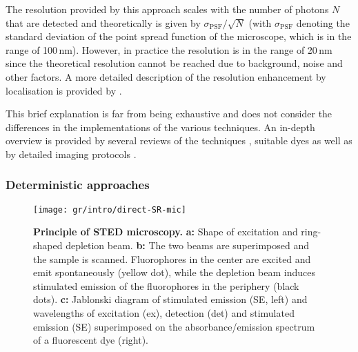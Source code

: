 The resolution provided by this approach scales with the number of photons $N$
that are detected and theoretically is given by $\sigma_\text{PSF}/\sqrt{N}$
(with $\sigma_\text{PSF}$ denoting the standard deviation of the point spread
function of the microscope, which is in the range of 100\,nm). However, in
practice the resolution is in the range of 20\,nm \cite{Betzig2006,Rust2006}
since the theoretical resolution cannot be reached due to background, noise
and other factors. A more detailed description of the resolution enhancement
by localisation is provided by \cite{Mortensen2010}.

This brief explanation is far from being exhaustive and does not consider the
differences in the implementations of the various techniques. An in-depth
overview is provided by several reviews of the techniques
\cite{Patterson2010,Sengupta2014,Liu2015,Sauer2017}, suitable dyes \cite{Li2018a} as well
as by detailed imaging protocols \cite{Gould2009,Schermelleh2010,Linde2011}.


\subsubsection{Deterministic approaches}
\label{sec:deterministic-approaches}

\begin{figure}
  \centering
  \texttt{[image: gr/intro/direct-SR-mic]}
  \caption{\textbf{Principle of STED microscopy.} \textbf{a:} Shape of
    excitation and ring-shaped depletion beam. \textbf{b:} The two beams are
    superimposed and the sample is scanned. Fluorophores in the center are
    excited and emit spontaneously (yellow dot), while the depletion beam
    induces stimulated emission of the fluorophores in the periphery (black
    dots). \textbf{c:} Jablonski diagram of stimulated emission (SE, left) and
    wavelengths of excitation (ex), detection (det) and stimulated emission
    (SE) superimposed on the absorbance/emission spectrum of a fluorescent dye
    (right).}
\end{figure}



